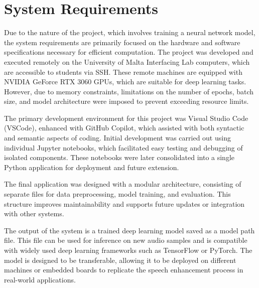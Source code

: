 \section{System Requirements}
\label{sec:system_requirements}

Due to the nature of the project, which involves training a neural network model, the system requirements are primarily focused on the hardware and software specifications necessary for efficient computation. The project was developed and executed remotely on the University of Malta Interfacing Lab computers, which are accessible to students via SSH. These remote machines are equipped with NVIDIA GeForce RTX 3060 GPUs, which are suitable for deep learning tasks. However, due to memory constraints, limitations on the number of epochs, batch size, and model architecture were imposed to prevent exceeding resource limits.

The primary development environment for this project was Visual Studio Code (VSCode), enhanced with GitHub Copilot, which assisted with both syntactic and semantic aspects of coding. Initial development was carried out using individual Jupyter notebooks, which facilitated easy testing and debugging of isolated components. These notebooks were later consolidated into a single Python application for deployment and future extension.

The final application was designed with a modular architecture, consisting of separate files for data preprocessing, model training, and evaluation. This structure improves maintainability and supports future updates or integration with other systems.

The output of the system is a trained deep learning model saved as a model path file. This file can be used for inference on new audio samples and is compatible with widely used deep learning frameworks such as TensorFlow or PyTorch. The model is designed to be transferable, allowing it to be deployed on different machines or embedded boards to replicate the speech enhancement process in real-world applications.
